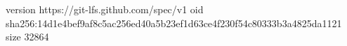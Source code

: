version https://git-lfs.github.com/spec/v1
oid sha256:14d1e4bef9af8c5ac256ed40a5b23ef1d63ce4f230f54c80333b3a4825da1121
size 32864
